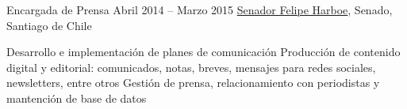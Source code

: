 \begin{joblist}[width=13.2, x=7.8, y=3.2]
\item[Encargada de Prensa]{Abril 2014 -- Marzo 2015}
    {
    \href{https://www.harboe.cl/}{Senador Felipe Harboe}, Senado, Santiago de Chile
    }
    {
        \iftbftiny \vspace{-0.5cm} \fi
        \begin{itemize}
            \iftbftiny \setlength\itemsep{-3pt} \fi
            \cvitem[\checkmark] Desarrollo e implementación de planes de comunicación 
            \cvitem[\checkmark] Producción de contenido digital y editorial: comunicados, notas, breves, mensajes para redes sociales, newsletters, entre otros
            \cvitem[\checkmark] Gestión de prensa, relacionamiento con periodistas y mantención de base de datos
            
        \end{itemize}
    }


\end{joblist}


%
%

